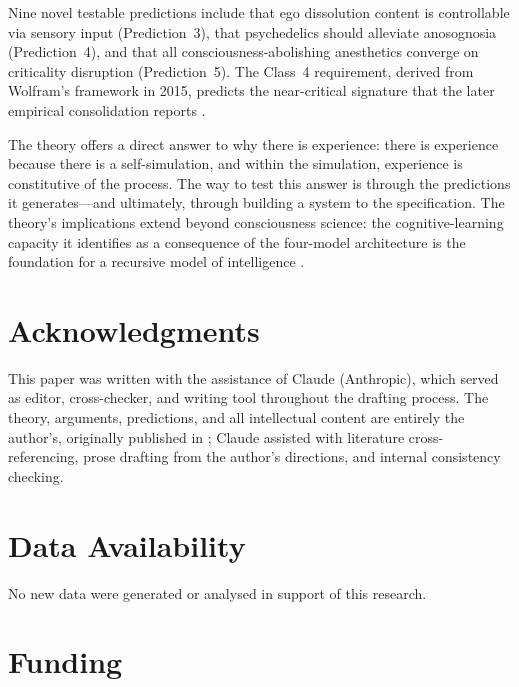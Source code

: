 \documentclass[12pt]{article}
\begin{document}
Nine novel testable predictions include that ego dissolution content is controllable via sensory input (Prediction~3), that psychedelics should alleviate anosognosia (Prediction~4), and that all consciousness-abolishing anesthetics converge on criticality disruption (Prediction~5). The Class~4 requirement, derived from Wolfram's framework in 2015, predicts the near-critical signature that the later empirical consolidation reports \citep{HengenShew2025,AlgomShriki2026}.

The theory offers a direct answer to why there is experience: there is experience because there is a self-simulation, and within the simulation, experience is constitutive of the process. The way to test this answer is through the predictions it generates---\hspace{0pt}and ultimately, through building a system to the specification. The theory's implications extend beyond consciousness science: the cognitive-learning capacity it identifies as a consequence of the four-model architecture is the foundation for a recursive model of intelligence \citep{Gruber2026a}.




\section*{Acknowledgments}

This paper was written with the assistance of Claude (Anthropic), which served as editor, cross-checker, and writing tool throughout the drafting process. The theory, arguments, predictions, and all intellectual content are entirely the author's, originally published in \citet{Gruber2015}; Claude assisted with literature cross-referencing, prose drafting from the author's directions, and internal consistency checking.


\section*{Data Availability}

No new data were generated or analysed in support of this research.


\section*{Funding}
\end{document}
